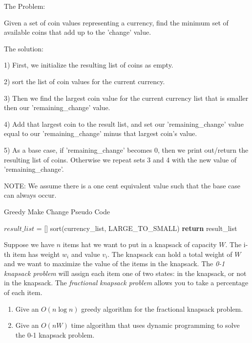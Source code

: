 \documentclass{article}
\begin{document}
The Problem:

Given a set of coin values representing a currency, find the minimum set of available coins that add up to the 'change' value.

The solution:

1) First, we initialize the resulting list of coins as empty.

2) sort the list of coin values for the current currency.

3) Then we find the largest coin value for the current currency list that is smaller then our 'remaining\_change' value.

4) Add that largest coin to the result list, and set our 'remaining\_change' value equal to our 'remaining\_change' minus that largest coin's value.

5) As a base case, if 'remaining\_change' becomes 0, then we print out/return the resulting list of coins. Otherwise we repeat sets 3 and 4 with the new value of 'remaining\_change'. 

NOTE: We assume there is a one cent equivalent value such that the base case can always occur.

\begin{algorithm}
        \caption{Greedy Make Change Pseudo Code}
        \begin{algorithmic}
            \State $result\_list$ = []
            \State sort(currency_list, LARGE_TO_SMALL) 
            \State \textbf{return} result\_list
        \EndProcedure
    \end{algorithmic}
\end{algorithm}


\nextprob
Suppose we have $n$ items hat we want to put in a knapsack of capacity $W$.  The i-th item has
weight $w_i$ and value $v_i$.  The knapsack can hold a total weight of $W$ and
we want to maximize the value of the items in the knapsack.
The \emph{0-1 knapsack problem} will assign each item one of two states: in the
knapsack, or not in the knapsack.  The \emph{fractional knapsack problem} allows
you to take a percentage of each item.
\begin{enumerate}
    \item Give an $O(n\log n)$ greedy algorithm for the fractional knapsack problem.
    \item Give an $O(nW)$ time algorithm that uses dynamic programming to solve
        the 0-1 knapsack problem.
\end{enumerate}
\end{document}
